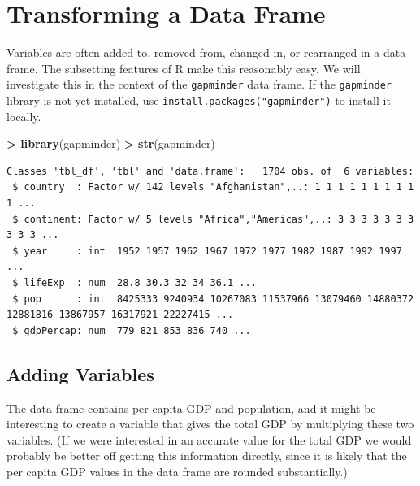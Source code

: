 \documentclass[]{krantz}
\makeatletter
\newenvironment{Shaded}{\begin{snugshade}}{\end{snugshade}}
\newcommand{\KeywordTok}[1]{\textcolor[rgb]{0.27,0.27,0.27}{\textbf{#1}}}
\newcommand{\NormalTok}[1]{#1}
\newcommand{\OperatorTok}[1]{\textcolor[rgb]{0.43,0.43,0.43}{\textbf{#1}}}
\newcommand{\StringTok}[1]{\textcolor[rgb]{0.5,0.5,0.5}{#1}}
\newenvironment{kframe}{%
\medskip{}
\setlength{\fboxsep}{.8em}
 \def\at@end@of@kframe{}%
 \ifinner\ifhmode%
  \def\at@end@of@kframe{\end{minipage}}%
  \begin{minipage}{\columnwidth}%
 \fi\fi%
 \def\FrameCommand##1{\hskip\@totalleftmargin \hskip-\fboxsep
 \colorbox{shadecolor}{##1}\hskip-\fboxsep
     \hskip-\linewidth \hskip-\@totalleftmargin \hskip\columnwidth}%
 \MakeFramed {\advance\hsize-\width
   \@totalleftmargin\z@ \linewidth\hsize
   \@setminipage}}%
 {\par\unskip\endMakeFramed%
 \at@end@of@kframe}
\renewenvironment{Shaded}{\begin{kframe}}{\end{kframe}}
\makeatother
\begin{document}
\hypertarget{transforming-a-data-frame}{%
\section{Transforming a Data Frame}\label{transforming-a-data-frame}}

Variables are often added to, removed from, changed in, or rearranged in a data frame. The subsetting features of R make this reasonably easy. We will investigate this in the context of the \texttt{gapminder} data frame. If the \texttt{gapminder} library is not yet installed, use \texttt{install.packages("gapminder")} to install it locally.

\begin{Shaded}
\begin{Highlighting}[]
\OperatorTok{>}\StringTok{ }\KeywordTok{library}\NormalTok{(gapminder)}
\OperatorTok{>}\StringTok{ }\KeywordTok{str}\NormalTok{(gapminder)}
\end{Highlighting}
\end{Shaded}

\begin{verbatim}
Classes 'tbl_df', 'tbl' and 'data.frame':   1704 obs. of  6 variables:
 $ country  : Factor w/ 142 levels "Afghanistan",..: 1 1 1 1 1 1 1 1 1 1 ...
 $ continent: Factor w/ 5 levels "Africa","Americas",..: 3 3 3 3 3 3 3 3 3 3 ...
 $ year     : int  1952 1957 1962 1967 1972 1977 1982 1987 1992 1997 ...
 $ lifeExp  : num  28.8 30.3 32 34 36.1 ...
 $ pop      : int  8425333 9240934 10267083 11537966 13079460 14880372 12881816 13867957 16317921 22227415 ...
 $ gdpPercap: num  779 821 853 836 740 ...
\end{verbatim}

\hypertarget{adding-variables}{%
\subsection{Adding Variables}\label{adding-variables}}

The data frame contains per capita GDP and population, and it might be interesting to create a variable that gives the total GDP by multiplying these two variables. (If we were interested in an accurate value for the total GDP we would probably be better off getting this information directly, since it is likely that the per capita GDP values in the data frame are rounded substantially.)

\begin{Shaded}
\end{Shaded}
\end{document}
